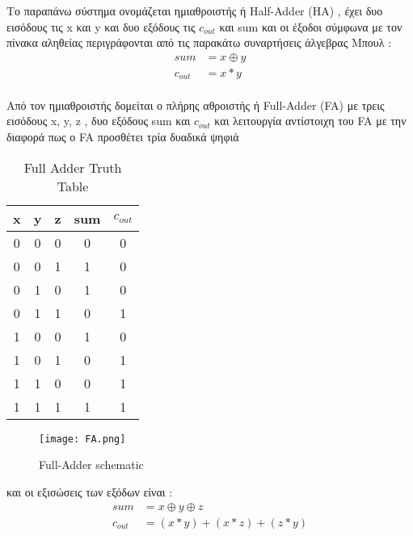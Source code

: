 Το παραπάνω σύστημα ονομάζεται ημιαθροιστής ή Half-Adder (HA) , έχει δυο εισόδους τις x και y και δυο εξόδους τις $c_{out}$ και sum και οι έξοδοι σύμφωνα με τον πίνακα αληθείας περιγράφονται από τις παρακάτω συναρτήσεις άλγεβρας Μπουλ :\\
\begin{equation}
\begin{split}
    sum &= x \oplus y \\ 
    c_{out} &= x * y
\end{split}
\end{equation}\\



Από τον ημιαθροιστής δομείται ο πλήρης αθροιστής ή Full-Adder (FA) με τρεις εισόδους x, y, z , δυο εξόδους sum και $c_{out}$ και λειτουργία αντίστοιχη του FA με την διαφορά πως ο FA προσθέτει τρία δυαδικά ψηφιά \\
\begin{multicols}{2}
\begin{table}[H]
\centering
 \begin{tabular}{||c c c | c c||} 
 \hline
 x & y & z & sum & $c_{out}$ \\ [0.5ex] 
 \hline\hline
 0 & 0 & 0 & 0 & 0 \\ 
 \hline
 0 & 0 & 1 & 1 & 0 \\
 \hline
 0 & 1 & 0 & 1 & 0 \\
 \hline
 0 & 1 & 1 & 0 & 1 \\
 \hline
 1 & 0 & 0 & 1 & 0 \\ 
 \hline
 1 & 0 & 1 & 0 & 1 \\
 \hline
 1 & 1 & 0 & 0 & 1 \\
 \hline
 1 & 1 & 1 & 1 & 1 \\
 \hline
\end{tabular}
\caption{Full Adder Truth Table}
\label{table:2}
\end{table}
\begin{figure}[H]
\centering
\texttt{[image: FA.png]}
\caption{Full-Adder schematic}
\label{FASchematic}
\end{figure}
\end{multicols}
και οι εξισώσεις των εξόδων είναι :
\begin{equation}
\begin{split}
    sum &= x \oplus y \oplus z \\
    c_{out} &= ( x * y ) + ( x * z ) + ( z * y )
\end{split}
\end{equation}




